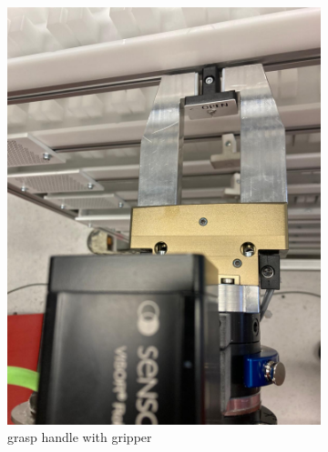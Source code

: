 \begin{figure}[h]
\begin{subfigure}[b]{0.32\textwidth}
        \includegraphics[width=\textwidth]{figures/shelf-control/hold-handle.jpeg}
        \caption{grasp handle with gripper}
        \label{subfig:grasp-handle}
    \end{subfigure}\hspace{0.1cm}
    \vspace{1cm}
    \begin{subfigure}[b]{0.32\textwidth}
        \centering

\end{subfigure}
\end{figure}
